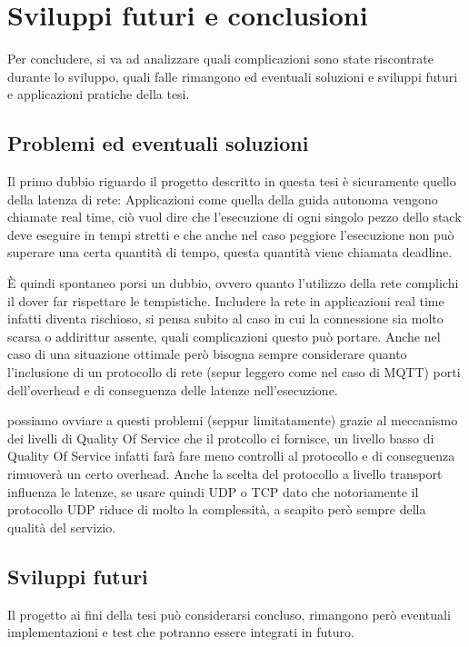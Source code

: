 \section{Sviluppi futuri e conclusioni}
Per concludere, si va ad analizzare quali complicazioni sono state riscontrate durante lo sviluppo, quali falle rimangono ed eventuali soluzioni e sviluppi futuri e applicazioni pratiche della tesi.

\subsection{Problemi ed eventuali soluzioni}
Il primo dubbio riguardo il progetto descritto in questa tesi è sicuramente quello della latenza di rete: Applicazioni come quella della guida autonoma vengono chiamate real time, ciò vuol dire che l'esecuzione di ogni singolo pezzo dello stack deve eseguire in tempi stretti e che anche nel caso peggiore l'esecuzione non può superare una certa quantità di tempo, questa quantità viene chiamata deadline.  

\noindent È quindi spontaneo porsi un dubbio, ovvero quanto l'utilizzo della rete complichi il dover far rispettare le tempistiche. Includere la rete in applicazioni real time infatti diventa rischioso, si pensa subito al caso in cui la connessione sia molto scarsa o addirittur assente, quali complicazioni questo può portare. Anche nel caso di una situazione ottimale però bisogna sempre considerare quanto l'inclusione di un protocollo di rete (sepur leggero come nel caso di MQTT) porti dell'overhead e di conseguenza delle latenze nell'esecuzione.

\noindent possiamo ovviare a questi problemi (seppur limitatamente) grazie al meccanismo dei livelli di Quality Of Service che il protcollo ci fornisce, un livello basso di Quality Of Service infatti farà fare meno controlli al protocollo e di conseguenza rimuoverà un certo overhead. Anche la scelta del protocollo a livello transport influenza le latenze, se usare quindi UDP o TCP dato che notoriamente il protocollo UDP riduce di molto la complessità, a scapito però sempre della qualità del servizio.

\subsection{Sviluppi futuri}
Il progetto ai fini della tesi può considerarsi concluso, rimangono però eventuali implementazioni e test che potranno essere integrati in futuro.


